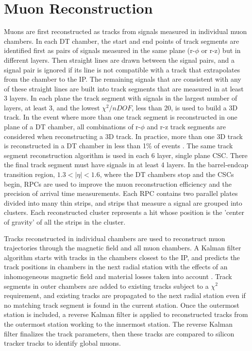\section{Muon Reconstruction}
\label{sec:muReco}
Muons are first reconstructed as tracks from signals measured in individual muon chambers.  In each DT chamber, the start and end points of 
track segments are identified first as pairs of signals measured in the same plane (r-$\phi$ or r-z) but in different layers.  Then straight 
lines are drawn between the signal pairs, and a signal pair is ignored if its line is not compatible with a track that extrapolates from 
the chamber to the IP.  The remaining signals that are consistent with any of these straight lines are built into track segments that are 
measured in at least 3 layers.  In each plane the track segment with signals in the largest number of layers, at least 3, and the lowest 
$\chi^{2}/nDOF$, less than 20, is used to build a 3D track.  In the event where more than one track segment is reconstructed 
in one plane of a DT chamber, all combinations of r-$\phi$ and r-z track segments are considered when reconstructing a 3D track.  In 
practice, more than one 3D track is reconstructed in a DT chamber in less than 1\% of events \cite{cmsTdrPhysPerformance}.  The same 
track segment reconstruction algorithm is used in each 6 layer, single plane CSC.  There the final track segment must have signals 
in at least 4 layers.  In the barrel-endcap transition region, $1.3 < |\eta| < 1.6$, where the DT chambers stop and the CSCs begin, RPCs 
are used to improve the muon reconstruction efficiency and the precision of arrival time measurements.  Each RPC contains two parallel 
plates divided into many thin strips, and strips that measure a signal are grouped into clusters.  Each reconstructed cluster represents 
a hit whose position is the 'center of gravity' of all the strips in the cluster.

Tracks reconstructed in individual chambers are used to reconstruct muon trajectories through the magnetic field and all muon chambers.  
A Kalman filter algorithm starts with tracks in the chambers closest to the IP, and predicts the track positions in chambers in the next 
radial station with the effects of an inhomogeneous magnetic field and material losses taken into account \cite{muonRecoFirstCollisions}.  
Track segments in outer chambers are added to existing tracks subject to a $\chi^{2}$ requirement, and existing tracks are propagated to 
the next radial station even if no matching track segment is found in the current station.  Once the outermost station is included, a 
reverse Kalman filter is applied to reconstructed tracks from the outermost station working to the innermost station.  The reverse Kalman 
filter finalizes the track parameters, then these tracks are compared to silicon tracker tracks to identify global muons.

